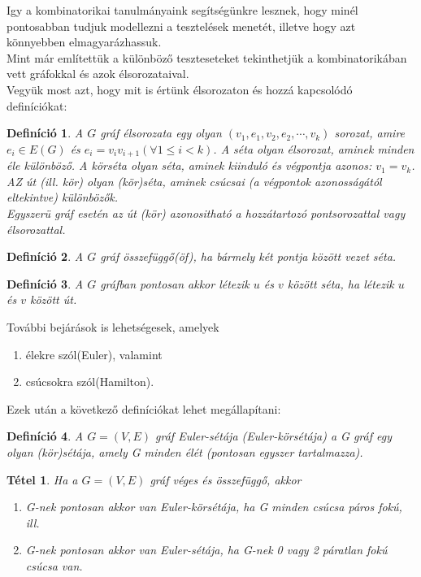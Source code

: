 \documentclass[12pt]{article}
\newtheorem{defin}{Definíció}[section]
\newtheorem{tetel}{Tétel}[section]
\begin{document}
Igy a kombinatorikai tanulmányaink segítségünkre lesznek, hogy minél pontosabban tudjuk modellezni a tesztelések menetét, illetve hogy azt könnyebben elmagyarázhassuk.\\
Mint már említettük a különböző teszteseteket tekinthetjük a kombinatorikában vett gráfokkal és azok élsorozataival.\\

Vegyük most azt, hogy mit is értünk élsorozaton és hozzá kapcsolódó definíciókat:

\begin{defin}
A $G$ gráf élsorozata egy olyan $(v_1,e_1,v_2,e_2,\cdots,v_k)$ sorozat, amire $e_i \in E(G)$ és $e_i = v_iv_{i+1} (\forall 1 \leq i < k)$. A séta olyan élsorozat, aminek minden éle különböző. A körséta olyan séta, aminek kiinduló és végpontja azonos: $v_1 = v_k$. AZ út (ill. kör) olyan (kör)séta, aminek csúcsai (a végpontok azonosságától eltekintve) különbözők.\\
Egyszerü gráf esetén az út (kör) azonositható a hozzátartozó pontsorozattal vagy élsorozattal. ~\cite{szam:Fleiner}
\end{defin}

\begin{defin}
A $G$ gráf összefüggő(öf), ha bármely két pontja között vezet séta. ~\cite{szam:Fleiner}
\end{defin}

\begin{defin}
A $G$ gráfban pontosan akkor létezik $u$ és $v$ között séta, ha létezik $u$ és $v$ között út. ~\cite{szam:Fleiner}
\end{defin}

További bejárások is lehetségesek, amelyek
\begin{enumerate}
\item élekre szól(Euler), valamint 
\item csúcsokra szól(Hamilton).
\end{enumerate}

Ezek után a következő definíciókat lehet megállapítani:

\begin{defin}
A $G = (V,E)$ gráf Euler-sétája (Euler-körsétája) a G gráf egy olyan (kör)sétája, amely G minden élét (pontosan egyszer tartalmazza). ~\cite{szam:Fleiner}
\end{defin}

\begin{tetel}
Ha a $G = (V,E)$ gráf véges és összefüggő, akkor 
\begin{enumerate}
\item G-nek pontosan akkor van Euler-körsétája, ha G minden csúcsa páros fokú, ill.
\item G-nek pontosan akkor van Euler-sétája, ha G-nek 0 vagy 2 páratlan fokú csúcsa van.
\end{enumerate} ~\cite{szam:Fleiner}
\end{tetel}
\end{document}

